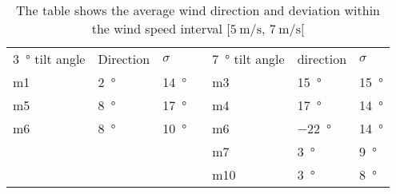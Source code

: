 \begin{table}[H]
\centering
\caption{The table shows the average wind direction and deviation within the wind speed interval $[\SI{5}{\meter\per\second},\, \SI{7}{\meter\per\second}[ $}
\begin{tabular}{lllll|l|l}
\multicolumn{1}{l|}{\SI{3}{\degree} tilt angle} & \multicolumn{1}{l|}{Direction} & $\sigma$ &  &  \SI{7}{\degree} tilt angle & direction & $\sigma$  \\ \cline{1-3} \cline{5-7} 
\multicolumn{1}{l|}{m1} & \multicolumn{1}{l|}{\SI{2}{\degree} }& \SI{14}{\degree} &  & m3    & \SI{15}{\degree}        & \SI{15}{\degree}  \\
\multicolumn{1}{l|}{m5} & \multicolumn{1}{l|}{ \SI{8}{\degree}} & \SI{17}{\degree} &  & m4    & \SI{17}{\degree}        & \SI{14}{\degree}  \\
\multicolumn{1}{l|}{m6} & \multicolumn{1}{l|}{ \SI{8}{\degree} } & \SI{10}{\degree} &  &m6    & \SI{-22}{\degree}       & \SI{14}{\degree}  \\
                                     &                                                          &                            &   & m7    &  \SI{3}{\degree}         & \SI{9}{\degree}  \\
                                     &                                                          &                           &   & m10   & \SI{3}{\degree}         & \SI{8}{\degree}  
\end{tabular}
\label{ta:meas:approved_data_par_wind}
\end{table}